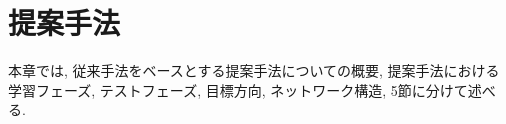 \chapter{提案手法}
\label{chap:suggest}
%
本章では, 従来手法をベースとする提案手法についての概要, 提案手法における学習フェーズ, テストフェーズ, 目標方向, ネットワーク構造, 5節に分けて述べる.
%
%





%
